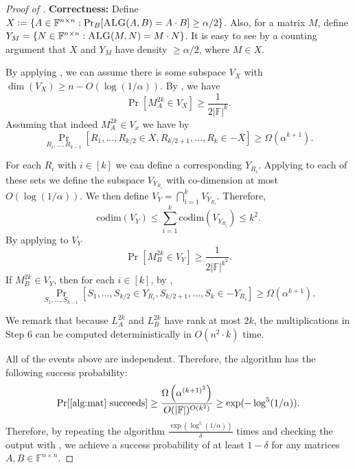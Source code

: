 \documentclass[12pt]{caltech_thesis}
\newcommand{\defeq}{\vcentcolon=}
\def\F{\mathbb{F}}
\newcommand{\codim}{\text{codim}}
\begin{document}
\begin{proof}[Proof of ]

\textbf{Correctness:} Define $X \defeq \left\{ A \in \F^{n \times n} : \Pr_B[\textsc{ALG}(A, B) = A\cdot B] \geq \alpha / 2 \right\}$. Also, for a matrix $M$, define $Y_M = \left\{ N \in \F^{n \times n} : \textsc{ALG}(M, N) = M \cdot N \right\}$. It is easy to see by a counting argument that $X$ and $Y_M$ have density $\geq \alpha / 2$, where $M \in X$.

By applying , we can assume there is some subspace $V_X$ with $\dim(V_X) \geq n - O(\log(1/\alpha))$. By , we have
\begin{equation*}
    \Pr[M^{2k}_A \in V_X] \geq \frac{1}{2|\F|^{k}}.
\end{equation*}
Assuming that indeed $M^{2k}_A \in V_x$ we have by 
\begin{equation*}
    \Pr_{R_i, ..., R_{k-1}}[R_1, ..., R_{k/2}\in X, R_{k/2 + 1}, ..., R_k \in -X] \geq \Omega(\alpha^{k+1}).
\end{equation*}

For each $R_i$ with $i \in [k]$ we can define a corresponding $Y_{R_i}$. Applying  to each of these sets we define the subspace $V_{Y_{R_i}}$ with co-dimension at most $O(\log(1 / \alpha))$. We then define $V_Y = \bigcap_{i=1}^k V_{Y_{R_i}}$. Therefore, 
\begin{equation*}
    \codim(V_Y) \leq \sum_{i=1}^k \codim(V_{Y_{R_i}}) \leq k^2.
\end{equation*}
By applying  to $V_Y$
\begin{equation*}
    \Pr[M^{2k}_B \in V_Y] \geq \frac{1}{2|\F|^{k^2}}.
\end{equation*}
If $M^{2k}_B \in V_Y$, then for each $i \in [k]$, by ,
\begin{equation*}
    \Pr_{S_1, ..., S_{k-1}}[S_1, ..., S_{k/2}\in Y_{R_i}, S_{k/2 + 1}, ..., S_k \in -Y_{R_i}] \geq \Omega(\alpha^{k+1}).
\end{equation*}

We remark that because $L^{2k}_A$ and $L^{2k}_B$ have rank at most $2k$, the multiplications in Step 6 can be computed deterministically in $O(n^2 \cdot k)$ time.

All of the events above are independent. Therefore, the algorithm has the following success probability:
\begin{equation*}
    \Pr[\text{\Cref{alg:mat} succeeds}] \geq \frac{\Omega\left(\alpha^{(k+1)^2}\right)}{O(|\F|)^{O(k^2)}}\\
    \geq \exp(-\log^5(1/\alpha)).
\end{equation*}
Therefore, by repeating the algorithm $\frac{\exp(\log^5(1/\alpha))}{\delta}$ times and checking the output with , we achieve a success probability of at least $1-\delta$ for any matrices $A, B \in \F^{n\times n}$.


\end{proof}
\end{document}
